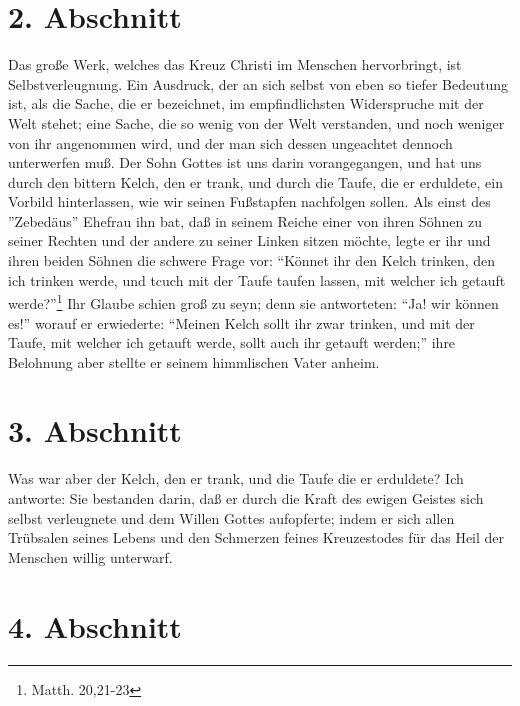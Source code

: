 \section{2. Abschnitt} \label{kap4_ab2}

Das große Werk, welches das Kreuz Christi im Menschen hervorbringt, ist
Selbstverleugnung. Ein Ausdruck, der an sich selbst von eben so tiefer Bedeutung
ist, als die Sache, die er bezeichnet, im empfindlichsten Widerspruche mit der
Welt stehet; eine Sache, die so wenig von der Welt verstanden, und noch weniger
von ihr angenommen wird, und der man sich dessen ungeachtet dennoch unterwerfen
muß. Der Sohn Gottes ist uns darin vorangegangen, und hat uns durch den bittern
Kelch, den er trank, und durch die Taufe, die er erduldete, ein Vorbild
hinterlassen, wie wir seinen Fußstapfen nachfolgen sollen. Als einst des
''Zebedäus'' Ehefrau ihn bat, daß in seinem Reiche einer von ihren Söhnen zu
seiner Rechten und der andere zu seiner Linken sitzen möchte, legte er ihr und
ihren beiden Söhnen die schwere Frage vor: "`Könnet ihr den Kelch trinken, den
ich trinken werde, und tcuch mit der Taufe taufen lassen, mit welcher ich
getauft werde?"'\footnote{Matth. 20,21-23} Ihr Glaube schien groß zu seyn; denn
sie antworteten: "`Ja! wir können es!"' worauf er erwiederte: "`Meinen Kelch
sollt ihr zwar trinken, und mit der Taufe, mit welcher ich getauft werde, sollt
auch ihr getauft werden;"' ihre Belohnung aber stellte er seinem himmlischen
Vater anheim.

\section{3. Abschnitt} \label{kap4_ab3}

Was war aber der Kelch, den er trank, und die Taufe die er erduldete? Ich
antworte: Sie bestanden darin, daß er durch die Kraft des ewigen Geistes sich
selbst verleugnete und dem Willen Gottes aufopferte; indem er sich allen
Trübsalen seines Lebens und den Schmerzen feines Kreuzestodes für das Heil der
Menschen willig unterwarf.

\section{4. Abschnitt} \label{kap4_ab4}

